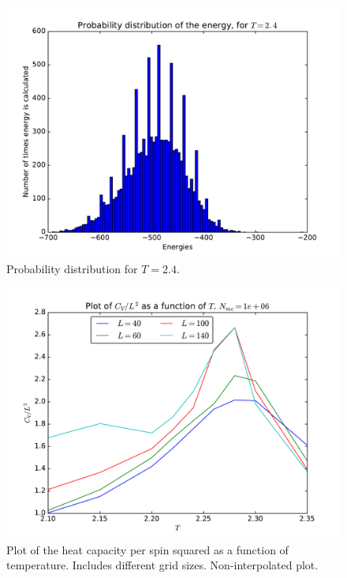 \documentclass[12pt]{article}
\begin{document}
\begin{figure}[H]
\centering
\includegraphics[width=\linewidth]{Plots/Probability_distribution_T2.pdf}
\caption{Probability distribution for $T=2.4$.}
\end{figure}

\begin{figure}[H]
\centering
\includegraphics[width=\linewidth]{Plots/Heat_capacity_parallellization.pdf}
\caption{Plot of the heat capacity per spin squared as a function of temperature. Includes different grid sizes. Non-interpolated plot.}
\label{fig:parallell_heat_capacity}
\end{figure}
\end{document}
